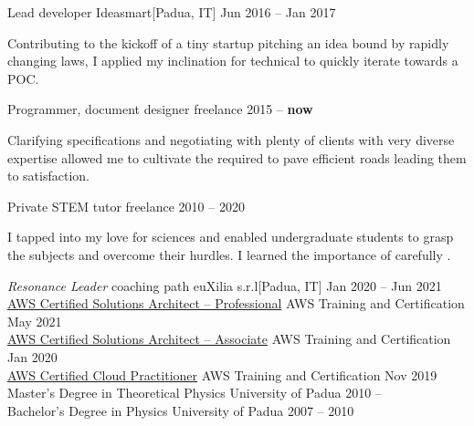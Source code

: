 \documentclass[9pt]{scrartcl}
\def\Phi{1.618}
\newlength{\Pad}\setlength{\Pad}{14.562pt} %
\begin{document}
\smallskip

\Event
  {Lead developer}
  {Ideasmart}[Padua, IT]
  {Jun 2016 -- Jan 2017}

Contributing to the kickoff of a tiny startup pitching an idea bound by rapidly
changing laws, I applied my inclination for technical 
to quickly iterate towards a POC.

\smallskip

\Event
  {Programmer, document designer}
  {freelance}
  {2015 -- \textbf{now}}

Clarifying specifications and negotiating with plenty of clients with very
diverse expertise allowed me to cultivate the  required to
pave efficient roads leading them to satisfaction.

\smallskip

\Event
  {Private STEM tutor}
  {freelance}
  {2010 -- 2020}

I tapped into my love for sciences and enabled undergraduate students to grasp
the subjects and overcome their hurdles. I learned the importance of carefully
.



\Event
  {\emph{Resonance Leader} coaching path}
  {euXilia s.r.l}[Padua, IT]
  {Jan 2020 -- Jun 2021}\\
\Event
  {\href{https://www.credly.com/badges/37aaaf27-3a2e-436d-9195-db4f46eb222e/public_url}
  {%
   AWS Certified Solutions Architect -- Professional}}
  {AWS Training and Certification}
  {May 2021}\\
\Event
  {\href{https://www.credly.com/badges/d092afab-f194-4074-ade6-78728c854faa/public_url}
  {%
   AWS Certified Solutions Architect -- Associate}}
  {AWS Training and Certification}
  {Jan 2020}\\
\Event
  {\href{https://www.credly.com/badges/d268e963-65ba-462b-a835-f65a7baccccd/public_url}
  {%
   AWS Certified Cloud Practitioner}}
  {AWS Training and Certification}
  {Nov 2019}\\
\Event
  {Master's Degree in Theoretical Physics}
  {University of Padua}
  {2010 -- }\\
\Event
  {Bachelor's Degree in Physics}
  {University of Padua}
  {2007 -- 2010}\\
\end{document}
